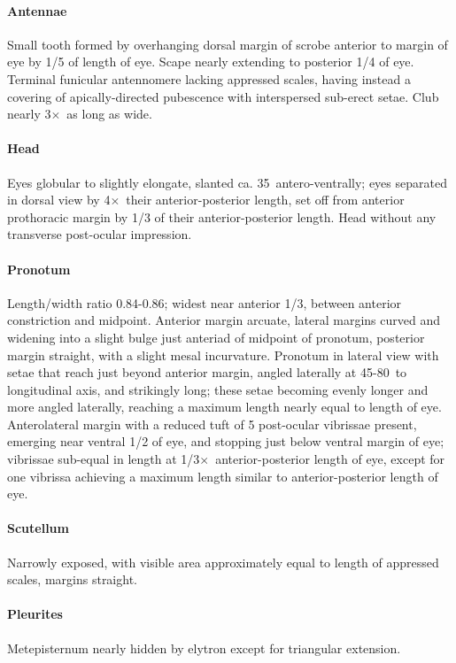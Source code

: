 \documentclass[fleqn,10pt,lineno]{wlpeerj} %
\newcommand{\td}{\textdegree~}
\newcommand{\x}{$\times$~}
\begin{document}
			\paragraph{Antennae}
				Small tooth formed by overhanging dorsal margin of scrobe anterior to margin of eye by 1/5 of length of eye.
				Scape nearly extending to posterior 1/4 of eye.
				Terminal funicular antennomere lacking appressed scales, having instead a covering of apically-directed pubescence with interspersed sub-erect setae.
				Club nearly 3\x as long as wide.
			\paragraph{Head}
				Eyes globular to slightly elongate, slanted ca. 35\td antero-ventrally; eyes separated in dorsal view by 4\x their anterior-posterior length, set off from anterior prothoracic margin by 1/3 of their anterior-posterior length. 
				Head without any transverse post-ocular impression.
			\paragraph{Pronotum}
				Length/width ratio 0.84-0.86; widest near anterior 1/3, between anterior constriction and midpoint. 
				Anterior margin arcuate, lateral margins curved and widening into a slight bulge just anteriad of midpoint of pronotum, posterior margin straight, with a slight mesal incurvature. 
				Pronotum in lateral view with setae that reach just beyond anterior margin, angled laterally at 45-80\td to longitudinal axis, and strikingly long; these setae becoming evenly longer and more angled laterally, reaching a maximum length nearly equal to length of eye. 
				Anterolateral margin with a reduced tuft of 5 post-ocular vibrissae present, emerging near ventral 1/2 of eye, and stopping just below ventral margin of eye; vibrissae sub-equal in length at 1/3\x anterior-posterior length of eye, except for one vibrissa achieving a maximum length similar to anterior-posterior length of eye.
			\paragraph{Scutellum}
				Narrowly exposed, with visible area approximately equal to length of appressed scales, margins straight.
			\paragraph{Pleurites}
				Metepisternum nearly hidden by elytron except for triangular extension.
\end{document}
